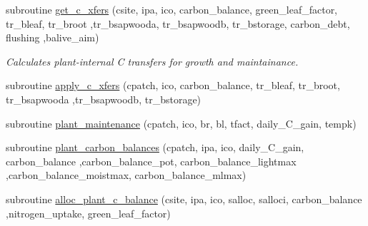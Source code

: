 \begin{DoxyCompactItemize}
\item 
subroutine \hyperlink{namespacegrowth__balive_a2308a9254122e6c26aaf642a88815ca3}{get\+\_\+c\+\_\+xfers} (csite, ipa, ico, carbon\+\_\+balance, green\+\_\+leaf\+\_\+factor, tr\+\_\+bleaf, tr\+\_\+broot                                                                                               ,tr\+\_\+bsapwooda, tr\+\_\+bsapwoodb, tr\+\_\+bstorage, carbon\+\_\+debt, flushing                                                                                                                       ,balive\+\_\+aim)
\begin{DoxyCompactList}\small\item\em Calculates plant-\/internal C transfers for growth and maintainance. \end{DoxyCompactList}\item 
subroutine \hyperlink{namespacegrowth__balive_a35d46b7fc86c4cecfe31abbc36713da2}{apply\+\_\+c\+\_\+xfers} (cpatch, ico, carbon\+\_\+balance, tr\+\_\+bleaf, tr\+\_\+broot, tr\+\_\+bsapwooda                                                                                                                               ,tr\+\_\+bsapwoodb, tr\+\_\+bstorage)
\item 
subroutine \hyperlink{namespacegrowth__balive_af977e6b599dfde9155a3ab3cb7175f16}{plant\+\_\+maintenance} (cpatch, ico, br, bl, tfact, daily\+\_\+\+C\+\_\+gain, tempk)
\item 
subroutine \hyperlink{namespacegrowth__balive_a9b1459d871399785ed2a6ec35e083b17}{plant\+\_\+carbon\+\_\+balances} (cpatch, ipa, ico, daily\+\_\+\+C\+\_\+gain, carbon\+\_\+balance                                                                                                                                                                                       ,carbon\+\_\+balance\+\_\+pot, carbon\+\_\+balance\+\_\+lightmax                                                                                                                                                                                       ,carbon\+\_\+balance\+\_\+moistmax, carbon\+\_\+balance\+\_\+mlmax)
\item 
subroutine \hyperlink{namespacegrowth__balive_aa34feeb938e58aab6d26db893e10aff3}{alloc\+\_\+plant\+\_\+c\+\_\+balance} (csite, ipa, ico, salloc, salloci, carbon\+\_\+balance                                                                                                                                                                                   ,nitrogen\+\_\+uptake, green\+\_\+leaf\+\_\+factor)
\item 

\end{DoxyCompactItemize}
